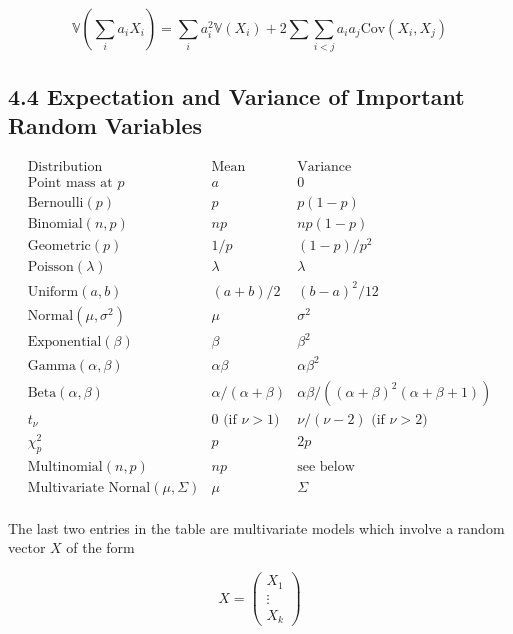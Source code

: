 \[ \mathbb{V}\left( \sum_{i} a_{i} X_{i} \right) = \sum_{i} a_{i}^{2} \mathbb{V}(X_{i}) + 2 \sum \sum_{i < j} a_{i} a_{j} \text{Cov}(X_{i}, X_{j}) \]

\subsection*{4.4 Expectation and Variance of Important Random
Variables}\label{expectation-and-variance-of-important-random-variables}

\[
\begin{array}{lll}
\text{Distribution} & \text{Mean} & \text{Variance}           \\
\hline
\text{Point mass at } p      & a             & 0              \\
\text{Bernoulli}(p)          & p             & p(1-p)         \\
\text{Binomial}(n, p)        & np            & np(1-p)        \\
\text{Geometric}(p)          & 1/p           & (1 - p)/p^{2}    \\
\text{Poisson}(\lambda)      & \lambda       & \lambda        \\
\text{Uniform}(a, b)         & (a + b) / 2   & (b - a)^{2} / 12 \\
\text{Normal}(\mu, \sigma^{2}) & \mu           & \sigma^{2}       \\
\text{Exponential}(\beta)    & \beta         & \beta^{2}        \\
\text{Gamma}(\alpha, \beta)  & \alpha \beta  & \alpha \beta^{2} \\
\text{Beta}(\alpha, \beta)   & \alpha / (\alpha + \beta) & \alpha \beta / ((\alpha + \beta)^{2} (\alpha + \beta + 1)) \\
t_\nu                        & 0 \text{ (if } \nu > 1 \text{)} & \nu / (\nu - 2) \text{ (if } \nu > 2 \text{)} \\
\chi^{2}_{p}                     & p             & 2p             \\
\text{Multinomial}(n, p)     & np            & \text{see below} \\
\text{Multivariate Nornal}(\mu, \Sigma) & \mu & \Sigma \\
\end{array}
\]

The last two entries in the table are multivariate models which involve
a random vector \(X\) of the form

\[ X = \begin{pmatrix} X_{1} \\ \vdots \\ X_{k} \end{pmatrix} \]

